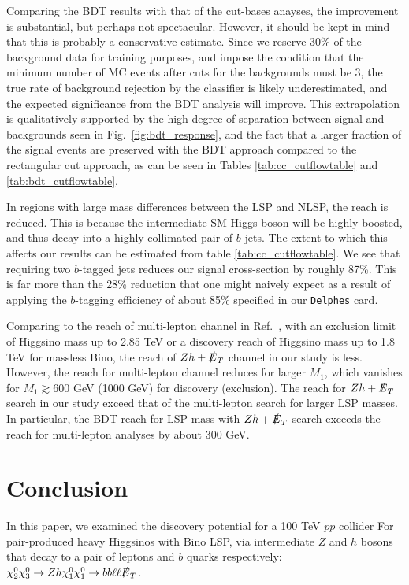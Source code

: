 \documentclass[a4paper,11pt]{article}
\newcommand{\met}{{\slashed{E}_T}}
\begin{document}
Comparing the BDT results with that of the cut-bases anayses, the improvement is substantial, but perhaps not spectacular. However, it should
be kept in mind that this is probably a conservative estimate. Since we reserve
30\% of the background data for training purposes, and impose the condition that the
minimum number of MC events after cuts for the backgrounds must be 3, the true rate of background
rejection by the classifier is likely underestimated, and the expected
significance from the BDT analysis will improve. This extrapolation is
qualitatively supported by the high degree of separation between signal and
backgrounds seen in Fig.~\ref{fig:bdt_response}, and the fact that a larger
fraction of the signal events are preserved with the BDT approach compared to
the rectangular cut approach, as can be seen in Tables \ref{tab:cc_cutflowtable}
and \ref{tab:bdt_cutflowtable}.  

In regions with large mass differences between the LSP and NLSP, the reach is
reduced.  This is because the intermediate SM Higgs boson will be highly boosted, and
thus decay into a highly collimated pair of $b$-jets. The extent to which this
affects our results can be estimated from table \ref{tab:cc_cutflowtable}. We
see that requiring two $b$-tagged jets reduces our signal cross-section by
roughly 87\%. This is far more than the 28\% reduction that one might naively
expect as a result of applying the $b$-tagging efficiency of about 85\%
specified in our \texttt{Delphes} card.  
 
 Comparing to the reach of multi-lepton channel in Ref.~\cite{Gori:2014oua}, with an  exclusion limit of Higgsino mass up to 2.85 TeV or a discovery reach of Higgsino mass up to 1.8 TeV for massless Bino, the reach of $Zh+\met$ channel in our study is less.  However, the reach for multi-lepton channel reduces for larger $M_1$, which vanishes for $M_1\gtrsim 600$ GeV (1000 GeV) for discovery (exclusion).   The reach for $Zh+\met$ search in our study exceed that of the multi-lepton search for larger LSP masses.  In particular, 
 the BDT reach for LSP mass with $Zh+\met$ search exceeds the reach for multi-lepton analyses by about 300 GeV.  



\section{Conclusion}\label{sec:conclusion}

In this paper, we examined the discovery potential for a 100 TeV $pp$ collider For 
pair-produced heavy Higgsinos with Bino LSP, via 
intermediate $Z$ and $h$ bosons that decay to a pair of leptons and $b$ quarks respectively:  $\chi_2^0\chi_3^0\rightarrow Zh \chi_1^0\chi_1^0\rightarrow bb\ell\ell \met$.
\end{document}
